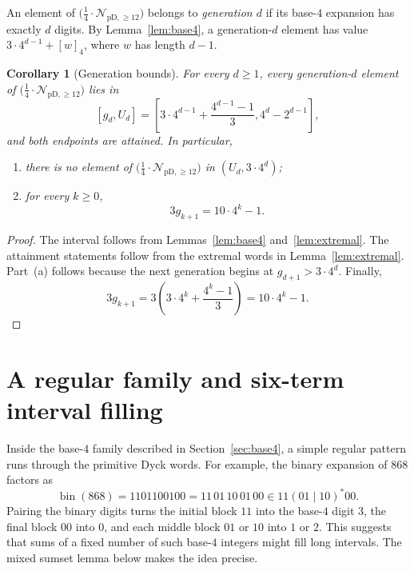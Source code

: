 \documentclass[12pt]{article}
\theoremstyle{plain}
\newtheorem{corollary}[theorem]{Corollary}
\theoremstyle{definition}
\theoremstyle{plain}
\newcommand{\Pset}{%
  \bigl(\tfrac{1}{4}\cdot\mathcal{N}_{\mathrm{pD},\geq 12}\bigr)%
}
\begin{document}
An element of $\Pset$ belongs to \emph{generation $d$} if its base-$4$
expansion has exactly $d$ digits.  By Lemma~\ref{lem:base4}, a generation-$d$
element has value $3\cdot4^{d-1}+[w]_4$, where $w$ has length $d-1$.

\begin{corollary}[Generation bounds]\label{cor:gen}
For every $d\geq1$, every generation-$d$ element of $\Pset$ lies in
\begin{equation}\label{eq:generation-interval}
  [g_d,U_d]
  =\left[
  3\cdot4^{d-1}+\frac{4^{d-1}-1}{3},
  4^d-2^{d-1}
  \right],
\end{equation}
and both endpoints are attained.  In particular,
\begin{enumerate}[label=\textup{(\alph*)}]
\item there is no element of $\Pset$ in $(U_d,3\cdot4^d)$;
\item for every $k\geq0$,
\begin{equation}\label{eq:three-g}
  3g_{k+1}=10\cdot4^k-1.
\end{equation}
\end{enumerate}
\end{corollary}

\begin{proof}
The interval follows from Lemmas~\ref{lem:base4} and~\ref{lem:extremal}.  The
attainment statements follow from the extremal words in
Lemma~\ref{lem:extremal}.  Part~(a) follows because the next generation begins
at $g_{d+1}>3\cdot4^d$.  Finally,
\[
  3g_{k+1}
  =3\left(3\cdot4^k+\frac{4^k-1}{3}\right)
  =10\cdot4^k-1.
\]
\end{proof}

\section{A regular family and six-term interval filling}\label{sec:regular}

Inside the base-$4$ family described in Section~\ref{sec:base4}, a simple regular pattern runs through the primitive Dyck words.  For
example, the binary expansion of $868$ factors as
\[
 \operatorname{bin}(868)=1101100100=11\,01\,10\,01\,00
 \in 11(01\mid10)^*00 .
\]
Pairing the binary digits turns the initial block $11$ into the base-$4$
digit $3$, the final block $00$ into $0$, and each middle block $01$ or
$10$ into $1$ or $2$.  This suggests that sums of a fixed number of such
base-$4$ integers might fill long intervals.  The mixed sumset lemma
below makes the idea precise.
\end{document}
